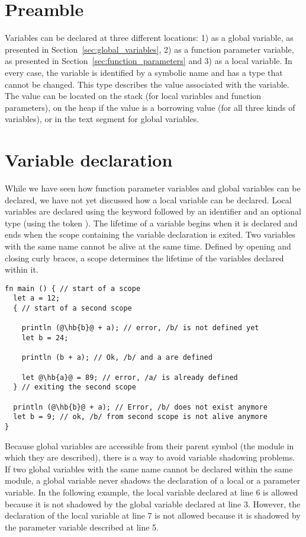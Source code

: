 \section{Preamble}

Variables can be declared at three different locations: 1) as a global variable,
as presented in Section~\ref{sec:global_variables}, 2) as a function parameter
variable, as presented in Section~\ref{sec:function_parameters} and 3) as a local
variable. In every case, the variable is identified by a symbolic name and has a
type that cannot be changed. This type describes the value associated with the
variable. The value can be located on the stack (for local variables and
function parameters), on the heap if the value is a borrowing value (for all
three kinds of variables), or in the text segment for global variables.

\section{Variable declaration}
\label{sec:local_variable_declaration}

While we have seen how function parameter variables and global variables can be
declared, we have not yet discussed how a local variable can be declared. Local
variables are declared using the keyword  followed by an identifier
and an optional type (using the token \token{:}). The lifetime of a variable
begins when it is declared and ends when the scope containing the variable
declaration is exited. Two variables with the same name cannot be alive at the
same time. Defined by opening and closing curly braces, a scope determines the
lifetime of the variables declared within it.

\begin{lstlisting}[style=coloredverbatim, escapechar=@]
fn main () { // start of a scope
  let a = 12;
  { // start of a second scope

    println (@\hb{b}@ + a); // error, /b/ is not defined yet
    let b = 24;

    println (b + a); // Ok, /b/ and a are defined

    let @\hb{a}@ = 89; // error, /a/ is already defined
  } // exiting the second scope

  println (@\hb{b}@ + a); // Error, /b/ does not exist anymore
  let b = 9; // ok, /b/ from second scope is not alive anymore
}
\end{lstlisting}

Because global variables are accessible from their parent symbol (the module in
which they are described), there is a way to avoid variable shadowing problems.
If two global variables with the same name cannot be declared within the same
module, a global variable never shadows the declaration of a local or a
parameter variable. In the following example, the local variable 
declared at line 6 is allowed because it is not shadowed by the global variable
declared at line 3. However, the declaration of the local variable 
at line 7 is not allowed because it is shadowed by the parameter variable
described at line 5.

